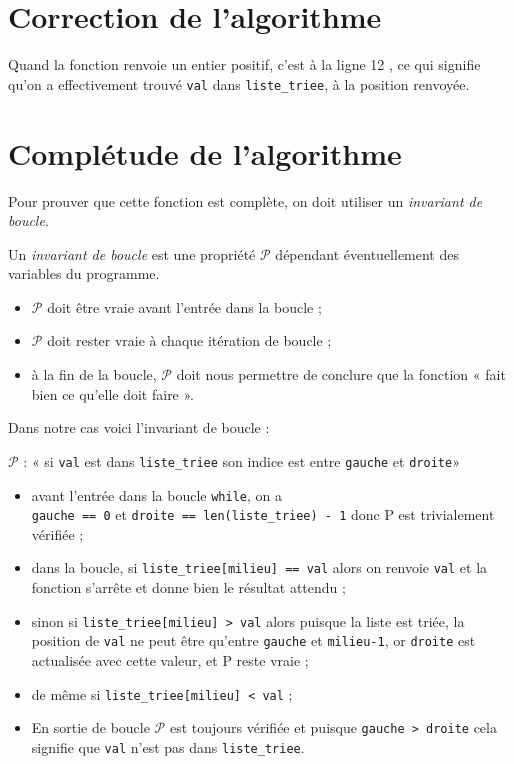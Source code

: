 \section{Correction de l'algorithme}

Quand la fonction renvoie un entier positif, c'est à la ligne 12  , ce qui signifie qu'on a effectivement trouvé \texttt{val} dans \texttt{liste_triee}, à la position renvoyée.  


\section{Complétude de l'algorithme}
Pour prouver que cette fonction est complète, on doit utiliser un \textit{invariant de boucle}.

\begin{definition}
	Un \textit{invariant de boucle} est une propriété $\mathcal{P}$ dépendant éventuellement des variables du programme. 
	\begin{itemize}
		\item 	$\mathcal{P}$ doit être vraie avant l'entrée dans la boucle ;
		\item 	$\mathcal{P}$ doit rester vraie à chaque itération de boucle ;
		\item 	à la fin de la boucle, $\mathcal{P}$ doit nous permettre de conclure que la fonction « fait bien ce qu'elle doit faire ».
	\end{itemize}
\end{definition}

Dans notre cas voici l'invariant de boucle :
\begin{center}
	$\mathcal{P}$ : « si \texttt{val} est dans \texttt{liste_triee} son indice est entre \texttt{gauche} et \texttt{droite}»
\end{center}

\begin{itemize}
	\item 	avant l'entrée dans la boucle \texttt{while}, on a\\
	      \texttt{gauche == 0} et \texttt{droite == len(liste_triee) - 1} donc P est trivialement vérifiée ;
	\item 	dans la boucle, si  \texttt{liste_triee[milieu] == val} alors on renvoie \texttt{val} et la fonction s'arrête et donne bien le résultat attendu ;
	\item   sinon si \texttt{liste_triee[milieu] > val} alors puisque la liste est triée, la position de \texttt{val} ne peut être qu'entre \texttt{gauche} et \texttt{milieu-1}, or \texttt{droite} est actualisée avec cette valeur, et P reste vraie ;
	\item 	de même si \texttt{liste_triee[milieu] < val} ;
	\item En sortie de boucle $\mathcal{P}$ est toujours vérifiée et puisque \texttt{gauche > droite} cela signifie que \texttt{val} n'est pas dans \texttt{liste_triee}.  
\end{itemize}

